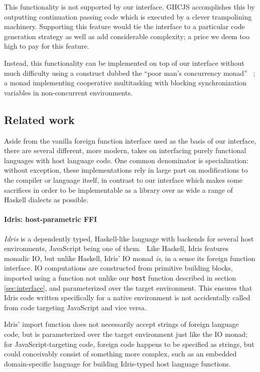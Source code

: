 \documentclass{sigplanconf}
\begin{document}
This functionality is not supported by our interface. GHCJS accomplishes this
by outputting continuation passing code which is executed by a clever
trampolining machinery. Supporting this feature would tie the interface to
a particular code generation strategy as well as add considerable complexity;
a price we deem too high to pay for this feature.

Instead, this functionality can be implemented on top of our interface without
much difficulty using a construct dubbed the ``poor man's concurrency monad''
\ \cite{poormansconcurrencymonad}; a monad implementing cooperative
multitasking with blocking synchronization variables in non-concurrent
environments.

\subsection{Related work}\label{sec:related}
Aside from the vanilla foreign function interface used as the basis of our
interface, there are several different, more modern, takes on interfacing
purely functional languages with host language code.
One common denominator is specialization: without exception, these
implementations rely in large part on modifications to the compiler or
language itself, in contrast to our interface which makes some sacrifices
in order to be implementable as a library over as wide a range of Haskell
dialects as possible.

\paragraph{Idris: host-parametric FFI}
\emph{Idris} is a dependently typed, Haskell-like language with backends for
several host environments, JavaScript being one of them.\ \cite{idris}
Like Haskell, Idris features monadic IO, but unlike Haskell, Idris' IO monad
\emph{is}, in a sense its foreign function interface.
IO computations are constructed from primitive building blocks, imported using
a function not unlike our \lstinline!host! function described in section
\ref{sec:interface}, and parameterized over the target environment.
This ensures that Idris code written specifically for a native environment
is not accidentally called from code targeting JavaScript and vice versa.

Idris' import function does not necessarily accept strings of foreign
language code, but is parameterized over the target environment just like the
IO monad; for JavaScript-targeting code, foreign code happens to be specified
as strings, but could conceivably consist of something more complex, such as
an embedded domain-specific language for building Idris-typed host language
functions.
\end{document}
